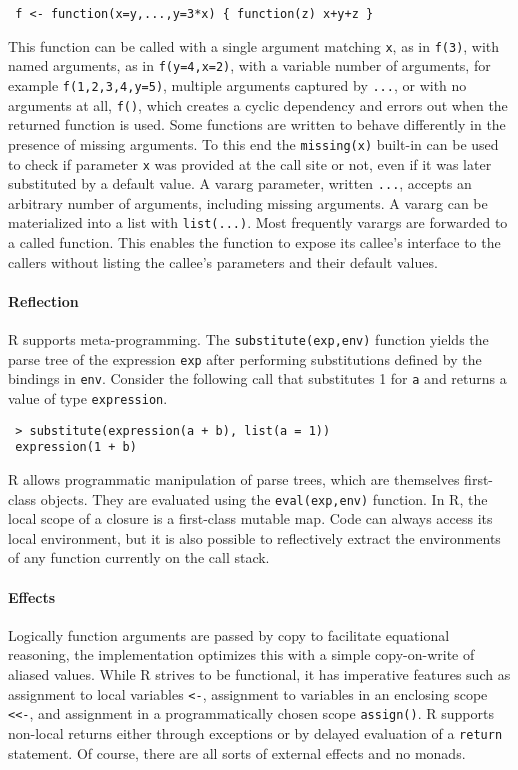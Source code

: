 \documentclass[review,creen,acmsmall]{acmart}
\renewcommand{\c}[1]{\lstinline |#1|\xspace}
\begin{document}
\begin{lstlisting}
 f <- function(x=y,...,y=3*x) { function(z) x+y+z }
\end{lstlisting}


This function can be called with a single argument matching \c x, as in
\c{f(3)}, with named arguments, as in \c{f(y=4,x=2)}, with a variable
number of arguments, for example \c{f(1,2,3,4,y=5)}, multiple arguments
captured by \c{...}, or with no arguments at all, \c{f()}, which creates a
cyclic dependency and errors out when the returned function is used. Some
functions are written to behave differently in the presence of missing
arguments. To this end the \c{missing(x)} built-in can be used to check if
parameter \c{x} was provided at the call site or not, even if it was later
substituted by a default value. A vararg parameter, written \c{...}, accepts
an arbitrary number of arguments, including missing arguments. A vararg can be
materialized into a list with \c{list(...)}. Most frequently varargs are
forwarded to a called function. This enables the function to expose its callee's
interface to the callers without listing the callee's parameters and their
default values.

\paragraph{Reflection}
R supports meta-programming. The \c{substitute(exp,env)} function yields the
parse tree of the expression \c{exp} after performing substitutions defined
by the bindings in \c{env}. Consider the following call that substitutes 1
for \c a and returns a value of type \c{expression}.

\begin{lstlisting}
 > substitute(expression(a + b), list(a = 1))
 expression(1 + b)
\end{lstlisting}

R allows programmatic manipulation of parse trees, which are themselves
first-class objects. They are evaluated using the \c{eval(exp,env)} function.
In R, the local scope of a closure is a first-class mutable map. Code can always
access its local environment, but it is also possible to reflectively extract
the environments of any function currently on the call stack.

\paragraph{Effects} Logically function arguments are passed by copy to
facilitate equational reasoning, the implementation optimizes this with a simple
copy-on-write of aliased values. While R strives to be functional, it has
imperative features such as assignment to local variables \c{<-}, assignment
to variables in an enclosing scope \c{<<-}, and assignment in a
programmatically chosen scope \c{assign()}. R supports non-local returns
either through exceptions or by delayed evaluation of a \c{return} statement.
Of course, there are all sorts of external effects and no monads.
\end{document}
